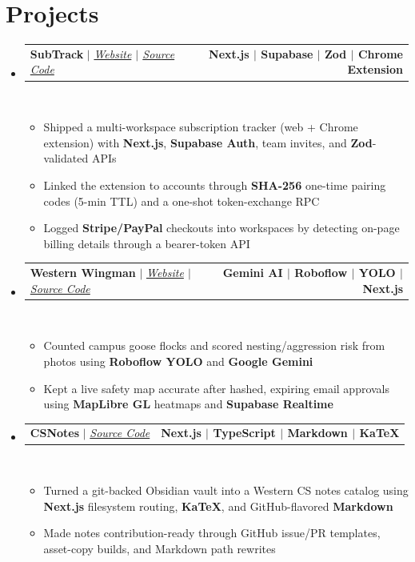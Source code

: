\documentclass[letterpaper,10pt]{article}
\makeatletter
\newcommand{\resumeItem}[1]{
  \item\small{
    {#1 \vspace{0pt}}
  }
}
\newcommand{\resumeProjectHeading}[2]{
    \item
    \begin{tabular*}{1.001\textwidth}{l@{\extracolsep{\fill}}r}
      \small#1 & \textbf{\small #2}\\
    \end{tabular*}\vspace{0.5pt}
}
\newcommand{\resumeSubHeadingListStart}{\begin{itemize}[leftmargin=0.0in, label={}, itemsep=2pt, parsep=0pt, topsep=0pt, partopsep=0pt]}
\newcommand{\resumeSubHeadingListEnd}{\end{itemize}\vspace{0pt}}
\newcommand{\resumeItemListStart}{\begin{itemize}[itemsep=0.6pt, parsep=0pt, topsep=0.4pt, partopsep=0pt]}
\newcommand{\resumeItemListEnd}{\end{itemize}\vspace{-1pt}}
\makeatother
\begin{document}
\section{Projects}
    \resumeSubHeadingListStart
     \resumeProjectHeading
            {\textbf{{SubTrack}} $|$ \emph{\href{https://subtrackers.vercel.app/}{Website}{ $|$ }\href{https://github.com/davidanukam/subtrack}{Source Code}}}{Next.js $|$ Supabase $|$ Zod $|$ Chrome Extension}
            \\[1mm]
          \resumeItemListStart
            \resumeItem{Shipped a multi-workspace subscription tracker (web + Chrome extension) with \textbf{Next.js}, \textbf{Supabase Auth}, team invites, and \textbf{Zod}-validated APIs}
            \resumeItem{Linked the extension to accounts through \textbf{SHA-256} one-time pairing codes (5-min TTL) and a one-shot token-exchange RPC}
            \resumeItem{Logged \textbf{Stripe/PayPal} checkouts into workspaces by detecting on-page billing details through a bearer-token API}
          \resumeItemListEnd
 \vspace{2pt}
 \resumeProjectHeading
{\textbf{{Western Wingman}} $|$ \emph{\href{https://western-wingman.vercel.app/}{Website}{ $|$ }\href{https://github.com/davidanukam/western-wingman}{Source Code}}}{Gemini AI $|$ Roboflow $|$ YOLO $|$ Next.js}
\\[1mm]
\resumeItemListStart
\resumeItem{Counted campus goose flocks and scored nesting/aggression risk from photos using \textbf{Roboflow YOLO} and \textbf{Google Gemini}}
\resumeItem{Kept a live safety map accurate after hashed, expiring email approvals using \textbf{MapLibre GL} heatmaps and \textbf{Supabase Realtime}}
\resumeItemListEnd
 \vspace{2pt}
    \resumeProjectHeading
            {\textbf{{CSNotes}} $|$ \emph{\href{https://github.com/davidanukam/CSNotes}{Source Code}}}{Next.js $|$ TypeScript $|$ Markdown $|$ KaTeX}
            \\[1mm]
          \resumeItemListStart
            \resumeItem{Turned a git-backed Obsidian vault into a Western CS notes catalog using \textbf{Next.js} filesystem routing, \textbf{KaTeX}, and GitHub-flavored \textbf{Markdown}}
            \resumeItem{Made notes contribution-ready through GitHub issue/PR templates, asset-copy builds, and Markdown path rewrites}
          \resumeItemListEnd

\resumeSubHeadingListEnd
\vspace{2pt}
\end{document}
